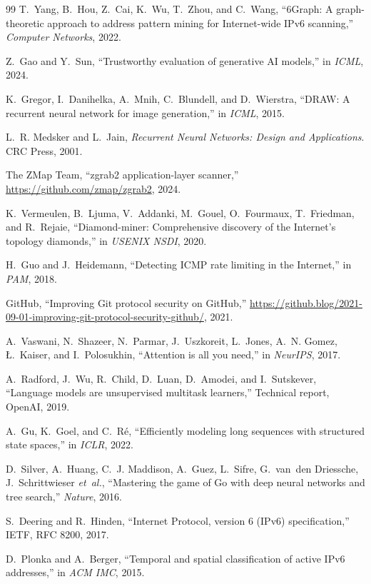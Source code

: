 \documentclass[conference]{IEEEtran}
\begin{document}
\begin{thebibliography}{99}
T.~Yang, B.~Hou, Z.~Cai, K.~Wu, T.~Zhou, and C.~Wang,
``6Graph: A graph-theoretic approach to address pattern mining for
Internet-wide IPv6 scanning,''
\emph{Computer Networks}, 2022.

Z.~Gao and Y.~Sun,
``Trustworthy evaluation of generative AI models,''
in \emph{ICML}, 2024.

K.~Gregor, I.~Danihelka, A.~Mnih, C.~Blundell, and D.~Wierstra,
``DRAW: A recurrent neural network for image generation,''
in \emph{ICML}, 2015.

L.~R. Medsker and L.~Jain,
\emph{Recurrent Neural Networks: Design and Applications}.
CRC Press, 2001.

The ZMap Team,
``zgrab2 application-layer scanner,''
\url{https://github.com/zmap/zgrab2}, 2024.

K.~Vermeulen, B.~Ljuma, V.~Addanki, M.~Gouel, O.~Fourmaux,
T.~Friedman, and R.~Rejaie,
``Diamond-miner: Comprehensive discovery of the Internet's topology
diamonds,''
in \emph{USENIX NSDI}, 2020.

H.~Guo and J.~Heidemann,
``Detecting ICMP rate limiting in the Internet,''
in \emph{PAM}, 2018.

GitHub,
``Improving Git protocol security on GitHub,''
\url{https://github.blog/2021-09-01-improving-git-protocol-security-github/},
2021.

A.~Vaswani, N.~Shazeer, N.~Parmar, J.~Uszkoreit, L.~Jones,
A.~N. Gomez, {\L}.~Kaiser, and I.~Polosukhin,
``Attention is all you need,''
in \emph{NeurIPS}, 2017.

A.~Radford, J.~Wu, R.~Child, D.~Luan, D.~Amodei, and I.~Sutskever,
``Language models are unsupervised multitask learners,''
Technical report, OpenAI, 2019.

A.~Gu, K.~Goel, and C.~R\'e,
``Efficiently modeling long sequences with structured state spaces,''
in \emph{ICLR}, 2022.

D.~Silver, A.~Huang, C.~J. Maddison, A.~Guez, L.~Sifre, G.~van~den
Driessche, J.~Schrittwieser \emph{et~al.},
``Mastering the game of Go with deep neural networks and tree
search,''
\emph{Nature}, 2016.

S.~Deering and R.~Hinden,
``Internet Protocol, version 6 (IPv6) specification,''
IETF, RFC 8200, 2017.

D.~Plonka and A.~Berger,
``Temporal and spatial classification of active IPv6 addresses,''
in \emph{ACM IMC}, 2015.

\end{thebibliography}
\end{document}
